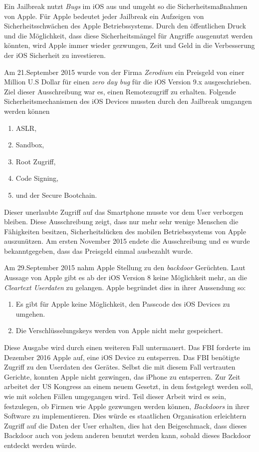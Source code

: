 Ein Jailbreak nutzt \textit{\glqq Bugs\grqq{}} im iOS aus und umgeht so die Sicherheitsmaßnahmen von Apple. Für Apple bedeutet jeder Jailbreak ein Aufzeigen von Sicherheitsschwächen des Apple Betriebssystems. Durch den öffentlichen Druck und die Möglichkeit, dass diese Sicherheitsmängel für Angriffe ausgenutzt werden könnten, wird Apple immer wieder gezwungen, Zeit und Geld in die Verbesserung der iOS Sicherheit zu investieren. 

Am 21.September 2015 wurde von der Firma \textit{\glqq Zerodium\grqq{}} ein Preisgeld von einer Million U.S Dollar für einen \textit{\glqq zero day bug\grqq{}} für die iOS Version 9.x ausgeschrieben. Ziel dieser Ausschreibung war es, einen Remotezugriff zu erhalten. Folgende Sicherheitsmechanismen des iOS Devices mussten durch den Jailbreak umgangen werden können
\begin{enumerate}
    \item ASLR, 
    \item Sandbox,
    \item Root Zugriff, 
    \item Code Signing, 
    \item und der Secure Bootchain.
\end{enumerate}
Dieser unerlaubte Zugriff auf das Smartphone musste vor dem User verborgen bleiben. Diese Ausschreibung zeigt, dass nur mehr sehr wenige Menschen die Fähigkeiten besitzen, Sicherheitslücken des mobilen Betriebssystems von Apple auszunützen. Am ersten November 2015 endete die Ausschreibung und es wurde bekanntgegeben, dass das Preisgeld einmal ausbezahlt wurde. 

Am 29.September 2015 nahm Apple Stellung  zu den \textit{\glqq backdoor\grqq{}} Gerüchten. Laut Aussage von Apple gibt es ab der iOS Version 8 keine Möglichkeit mehr, an die \textit{\glqq Cleartext Userdaten\grqq{}} zu gelangen. Apple begründet dies in ihrer Aussendung so:
\begin{enumerate}
    \item Es gibt für Apple keine Möglichkeit, den Passcode des iOS Devices zu umgehen.
    \item Die Verschlüsselungskeys werden von Apple nicht mehr gespeichert.
\end{enumerate}

Diese Ausgabe wird durch einen weiteren Fall untermauert. Das FBI forderte im Dezember 2016 Apple auf, eine iOS Device zu entsperren. Das FBI benötigte Zugriff zu den Userdaten des Gerätes. Selbst die mit diesem Fall vertrauten Gerichte, konnten Apple nicht gezwingen, das iPhone zu entsperren. Zur Zeit arbeitet der US Kongress an einem neuem Gesetzt, in dem festgelegt werden soll, wie mit solchen Fällen umgegangen wird. Teil dieser Arbeit wird es sein, festzulegen, ob Firmen wie Apple gezwungen werden können, \textit{\glqq Backdoors\grqq{}} in ihrer Software zu implementieren. Dies würde es  staatlichen Organisation erleichtern Zugriff auf die Daten der User erhalten, dies hat den Beigeschmack, dass dieses Backdoor auch von jedem anderen benutzt werden kann, sobald dieses Backdoor entdeckt werden würde.

